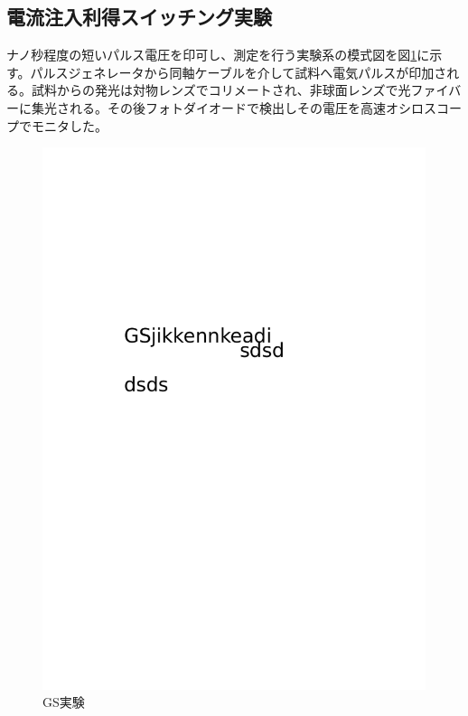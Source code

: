 \subsection{電流注入利得スイッチング実験}
ナノ秒程度の短いパルス電圧を印可し、測定を行う実験系の模式図を図\ref{fig:GS_setup}に示す。パルスジェネレータから同軸ケーブルを介して試料へ電気パルスが印加される。試料からの発光は対物レンズでコリメートされ、非球面レンズで光ファイバーに集光される。その後フォトダイオードで検出しその電圧を高速オシロスコープでモニタした。
\begin{figure}[htbp]
	\includegraphics[width=15cm]{../a/GS_setup.png}
	\caption{GS実験}
	\label{fig:GS_setup}
\end{figure}


